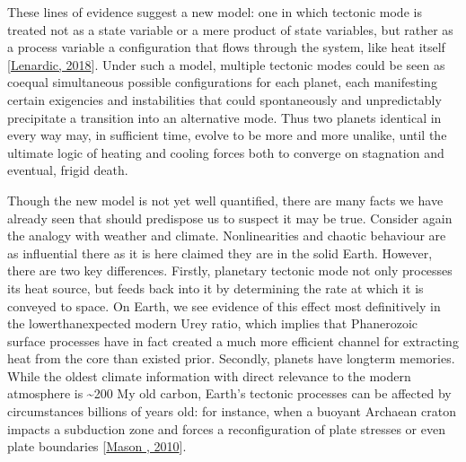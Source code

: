 \documentclass[letterpaper,10pt,english]{jupyterBook}
\begin{document}
\sphinxAtStartPar
These lines of evidence suggest a new model: one in which tectonic mode is treated not as a state variable or a mere product of state variables, but rather as a process variable \sphinxhyphen{} a configuration that flows through the system, like heat itself {[}\hyperlink{cite.references:id416}{Lenardic, 2018}{]}. Under such a model, multiple tectonic modes could be seen as coequal simultaneous possible configurations for each planet, each manifesting certain exigencies and instabilities that could spontaneously and unpredictably precipitate a transition into an alternative mode. Thus two planets identical in every way may, in sufficient time, evolve to be more and more unalike, until the ultimate logic of heating and cooling forces both to converge on stagnation and eventual, frigid death.

\sphinxAtStartPar
Though the new model is not yet well quantified, there are many facts we have already seen that should predispose us to suspect it may be true. Consider again the analogy with weather and climate. Non\sphinxhyphen{}linearities and chaotic behaviour are as influential there as it is here claimed they are in the solid Earth. However, there are two key differences. Firstly, planetary tectonic mode not only processes its heat source, but feeds back into it by determining the rate at which it is conveyed to space. On Earth, we see evidence of this effect most definitively in the lower\sphinxhyphen{}than\sphinxhyphen{}expected modern Urey ratio, which implies that Phanerozoic surface processes have in fact created a much more efficient channel for extracting heat from the core than existed prior. Secondly, planets have long\sphinxhyphen{}term memories. While the oldest climate information with direct relevance to the modern atmosphere is \textasciitilde{}200 My old carbon, Earth’s tectonic processes can be affected by circumstances billions of years old: for instance, when a buoyant Archaean craton impacts a subduction zone and forces a reconfiguration of plate stresses or even plate boundaries {[}\hyperlink{cite.references:id208}{Mason , 2010}{]}.
\end{document}
